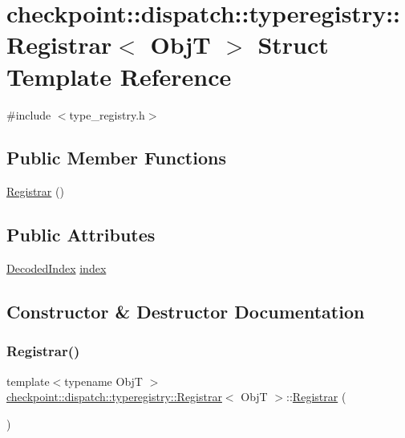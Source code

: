 \hypertarget{structcheckpoint_1_1dispatch_1_1typeregistry_1_1_registrar}{}\section{checkpoint\+:\+:dispatch\+:\+:typeregistry\+:\+:Registrar$<$ ObjT $>$ Struct Template Reference}
\label{structcheckpoint_1_1dispatch_1_1typeregistry_1_1_registrar}


{\ttfamily \#include $<$type\+\_\+registry.\+h$>$}

\subsection*{Public Member Functions}
\begin{DoxyCompactItemize}
\item 
\hyperlink{structcheckpoint_1_1dispatch_1_1typeregistry_1_1_registrar_a8eddeda9b18c2667b032d25a2b5bbceb}{Registrar} ()
\end{DoxyCompactItemize}
\subsection*{Public Attributes}
\begin{DoxyCompactItemize}
\item 
\hyperlink{namespacecheckpoint_1_1dispatch_1_1typeregistry_a3d1f57de0a997a245eb9e1db07b94140}{Decoded\+Index} \hyperlink{structcheckpoint_1_1dispatch_1_1typeregistry_1_1_registrar_ad2efba9399224c4fe27f1afdd89ecf0a}{index}
\end{DoxyCompactItemize}


\subsection{Constructor \& Destructor Documentation}
\mbox{\label{structcheckpoint_1_1dispatch_1_1typeregistry_1_1_registrar_a8eddeda9b18c2667b032d25a2b5bbceb}} 
\subsubsection{\texorpdfstring{Registrar()}{Registrar()}}
{\footnotesize\ttfamily template$<$typename ObjT $>$ \\
\hyperlink{structcheckpoint_1_1dispatch_1_1typeregistry_1_1_registrar}{checkpoint\+::dispatch\+::typeregistry\+::\+Registrar}$<$ ObjT $>$\+::\hyperlink{structcheckpoint_1_1dispatch_1_1typeregistry_1_1_registrar}{Registrar} (\begin{DoxyParamCaption}{ }\end{DoxyParamCaption})\hspace{0.3cm}{\ttfamily [inline]}}



